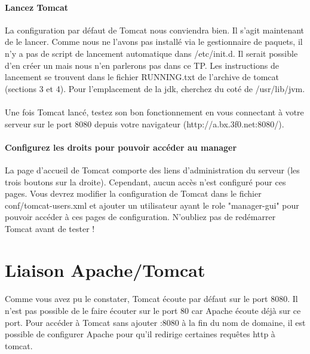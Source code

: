 \documentclass[12pt,a4paper]{article}
\begin{document}
\paragraph{Lancez Tomcat\\}
La configuration par défaut de Tomcat nous conviendra bien. Il s'agit maintenant de le lancer. Comme nous ne l'avons pas installé via le gestionnaire de paquets, il n'y a pas de script de lancement automatique dans /etc/init.d. Il serait possible d'en créer un mais nous n'en parlerons pas dans ce TP. Les instructions de lancement se trouvent dans le fichier RUNNING.txt de l'archive de tomcat (sections 3 et 4). Pour l'emplacement de la jdk, cherchez du coté de /usr/lib/jvm.

\paragraph{}
Une fois Tomcat lancé, testez son bon fonctionnement en vous connectant à votre serveur sur le port 8080 depuis votre navigateur (http://a.bx.3f0.net:8080/).

\paragraph{Configurez les droits pour pouvoir accéder au manager\\}
La page d'accueil de Tomcat comporte des liens d'administration du serveur (les trois boutons sur la droite). Cependant, aucun accès n'est configuré pour ces pages. Vous devrez modifier la configuration de Tomcat dans le fichier conf/tomcat-users.xml et ajouter un utilisateur ayant le role "manager-gui" pour pouvoir accéder à ces pages de configuration. N'oubliez pas de redémarrer Tomcat avant de tester !

\section{Liaison Apache/Tomcat}

\paragraph{}
Comme vous avez pu le constater, Tomcat écoute par défaut sur le port 8080. Il n'est pas possible de le faire écouter sur le port 80 car Apache écoute déjà sur ce port. Pour accéder à Tomcat sans ajouter :8080 à la fin du nom de domaine, il est possible de configurer Apache pour qu'il redirige certaines requêtes http à tomcat.
\end{document}

